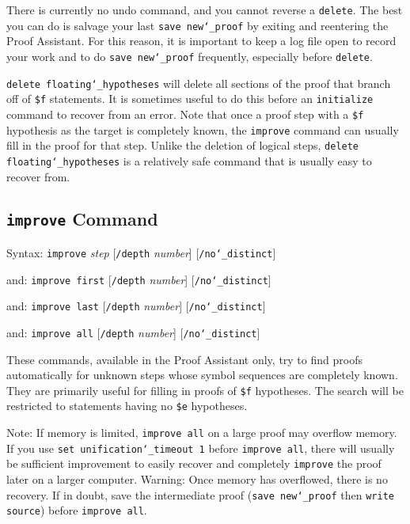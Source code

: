 There is currently no undo command, and you cannot reverse a
\texttt{delete}.  The best you can do is salvage your last \texttt{save
new{\char`\_}proof} by exiting and reentering the Proof Assistant.  For
this reason, it is important to keep a log file open to record your work
and to do \texttt{save new{\char`\_}proof} frequently, especially before
\texttt{delete}.

\texttt{delete floating{\char`\_}hypotheses} will delete all sections of
the proof that branch off of \texttt{\$f}
statements.  It is sometimes useful to do this before an
\texttt{initialize} command to recover from an error.  Note that once a
proof step with a \texttt{\$f} hypothesis as the target is completely
known, the \texttt{improve} command can usually fill in the proof for
that step.  Unlike the deletion of logical steps, \texttt{delete
floating{\char`\_}hypotheses} is a relatively safe command that is
usually easy to recover from.



\subsection{\texttt{improve} Command}
\label{improve}
Syntax:  \texttt{improve} {\em step} [\texttt{/depth} {\em number}]
                                               [\texttt{/no{\char`\_}distinct}]

   and:   \texttt{improve first} [\texttt{/depth} {\em number}]
                                              [\texttt{/no{\char`\_}distinct}]

   and:   \texttt{improve last} [\texttt{/depth} {\em number}]
                                              [\texttt{/no{\char`\_}distinct}]

   and:   \texttt{improve all} [\texttt{/depth} {\em number}]
                                              [\texttt{/no{\char`\_}distinct}]

These commands, available in the Proof Assistant
only, try to find proofs automatically for unknown steps whose symbol
sequences are completely known.  They are primarily useful for filling in
proofs of \texttt{\$f} hypotheses.  The
search will be restricted to statements having no
\texttt{\$e} hypotheses.

Note:  If memory is limited, \texttt{improve all} on a large proof may
overflow memory.  If you use \texttt{set unification{\char`\_}timeout 1}
before \texttt{improve all}, there will usually be sufficient
improvement to easily recover and completely \texttt{improve} the proof
later on a larger computer.  Warning:  Once memory has overflowed, there
is no recovery.  If in doubt, save the intermediate proof (\texttt{save
new{\char`\_}proof} then \texttt{write source}) before \texttt{improve
all}.

